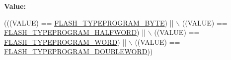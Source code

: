{\bfseries Value\+:}
\begin{DoxyCode}
(((VALUE) == \hyperlink{group___f_l_a_s_h___type___program_gac975d7139325057ed0069c6b55e4faed}{FLASH\_TYPEPROGRAM\_BYTE}) || \(\backslash\)
                                    ((VALUE) == \hyperlink{group___f_l_a_s_h___type___program_ga2b607dfc2efd463a8530e327bc755582}{FLASH\_TYPEPROGRAM\_HALFWORD}) || \(\backslash\)
                                    ((VALUE) == \hyperlink{group___f_l_a_s_h___type___program_gadd25c6821539030ba6711e7c0d586c3e}{FLASH\_TYPEPROGRAM\_WORD}) || \(\backslash\)
                                    ((VALUE) == \hyperlink{group___f_l_a_s_h___type___program_gabdc2b0b4d2e66c2be90fafbfbf1e225f}{FLASH\_TYPEPROGRAM\_DOUBLEWORD}))
\end{DoxyCode}
